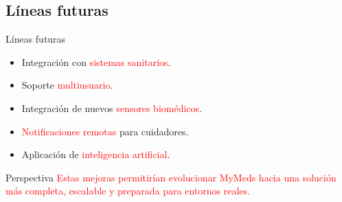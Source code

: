 \documentclass{beamer}
\begin{document}
\subsection{Líneas futuras}
\begin{frame}

\begin{block}{Líneas futuras}
\begin{itemize}
\item Integración con \textcolor{red}{sistemas sanitarios}.
\item Soporte \textcolor{red}{multiusuario}.
\item Integración de nuevos \textcolor{red}{sensores biomédicos}.
\item \textcolor{red}{Notificaciones remotas} para cuidadores.
\item Aplicación de \textcolor{red}{inteligencia artificial}.
\end{itemize}
\end{block}

\vspace{0.3cm}

\begin{block}{Perspectiva}
\centering
\textcolor{red}{Estas mejoras permitirían evolucionar MyMeds hacia una solución más completa, escalable y preparada para entornos reales.}
\end{block}


\end{frame}
%
\end{document}
